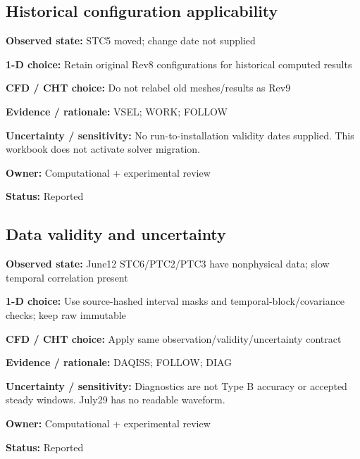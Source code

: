 \documentclass[11pt]{article}
\begin{document}
\par\noindent\begin{minipage}{\textwidth}\small\setlength{\parskip}{2pt}
\subsection*{Historical configuration applicability}
\textbf{Observed state:} STC5 moved; change date not supplied\par
\textbf{1-D choice:} Retain original Rev8 configurations for historical computed results\par
\textbf{CFD / CHT choice:} Do not relabel old meshes/results as Rev9\par
\textbf{Evidence / rationale:} VSEL; WORK; FOLLOW\par
\textbf{Uncertainty / sensitivity:} No run-to-installation validity dates supplied. This workbook does not activate solver migration.\par
\textbf{Owner:} Computational + experimental review\par
\textbf{Status:} Reported\par
\end{minipage}\par\vspace{5pt}
\par\noindent\begin{minipage}{\textwidth}\small\setlength{\parskip}{2pt}
\subsection*{Data validity and uncertainty}
\textbf{Observed state:} June12 STC6/PTC2/PTC3 have nonphysical data; slow temporal correlation present\par
\textbf{1-D choice:} Use source-hashed interval masks and temporal-block/covariance checks; keep raw immutable\par
\textbf{CFD / CHT choice:} Apply same observation/validity/uncertainty contract\par
\textbf{Evidence / rationale:} DAQISS; FOLLOW; DIAG\par
\textbf{Uncertainty / sensitivity:} Diagnostics are not Type B accuracy or accepted steady windows. July29 has no readable waveform.\par
\textbf{Owner:} Computational + experimental review\par
\textbf{Status:} Reported\par
\end{minipage}\par\vspace{5pt}
\end{document}
